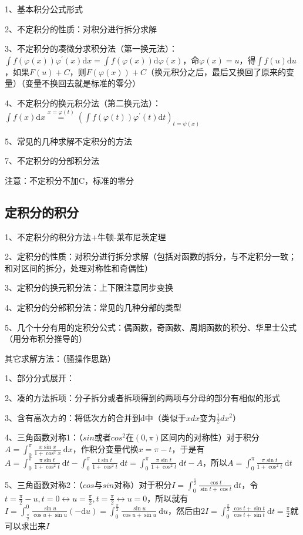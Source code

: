 1、基本积分公式形式

2、不定积分的性质：对积分进行拆分求解

3、不定积分的凑微分求积分法（第一换元法）：$\int f(\varphi(x)) \varphi^{\prime}(x) \mathrm{d} x =\int f(\varphi(x)) \mathrm{d} \varphi(x) $，命$\varphi(x)=u$，得$\int f(u) \mathrm{d} u $，如果$F(u)+C $，则$F(\varphi(x))+C$（换元积分之后，最后又换回了原来的变量）（变量不换回去就是标准的零分）

4、不定积分的换元积分法（第二换元法）：$\int f(x) \mathrm{d} x \stackrel{x=\varphi(t)}{=}\left(\int f(\varphi(t)) \varphi^{\prime}(t) \mathrm{d} t\right)_{t=\psi(x)}$

5、常见的几种求解不定积分的方法

7、不定积分的分部积分法

注意：不定积分不加C，标准的零分



\subsection{定积分的积分}

1、不定积分的积分方法+牛顿-莱布尼茨定理

2、定积分的性质：对积分进行拆分求解（包括对函数的拆分，与不定积分一致；和对区间的拆分，处理对称性和奇偶性）

3、定积分的换元积分法：上下限注意同步变换

4、定积分的分部积分法：常见的几种分部的类型

5、几个十分有用的定积分公式：偶函数，奇函数、周期函数的积分、华里士公式（用分布积分推导的）

其它求解方法：（骚操作思路）

1、部分分式展开：

2、凑的方法拆项：分子拆分或者拆项得到的两项与分母的部分有相似的形式

3、含有高次方的：将低次方的合并到d中（类似于$xdx$变为$\frac{1}{2}dx^2$）

4、三角函数对称1：（$sin$或者$cos^2$在$(0,\pi)$区间内的对称性）对于积分$A=\int_{0}^{\pi} \frac{x \sin x}{1+\cos ^{2} x} \mathrm{~d} x$，作积分变量代换$x=\pi-t$，于是有$A=\int_{0}^{\pi} \frac{\pi \sin t}{1+\cos ^{2} t} \mathrm{~d} t-\int_{0}^{\pi} \frac{t \sin t}{1+\cos ^{2} t} \mathrm{~d} t=\int_{0}^{\pi} \frac{\pi \sin t}{1+\cos ^{2} t} \mathrm{~d} t-A$，所以$A=\int_{0}^{\pi} \frac{\pi \sin t}{1+\cos ^{2} t} \mathrm{~d} t$

5、三角函数对称2：（$cos$与$sin$对称）对于积分$I=\int_{0}^{\frac{\pi}{2}} \frac{\cos t}{\sin t+\cos t} \mathrm{~d} t$，令$t=\frac{\pi}{2}-u, t=0 \leftrightarrow u=\frac{\pi}{2}, t=\frac{\pi}{2} \leftrightarrow u=0$，所以就有$I=\int_{\frac{\pi}{2}}^{0} \frac{\sin u}{\cos u+\sin u}(-\mathrm{d} u)=\int_{0}^{\frac{\pi}{2}} \frac{\sin u}{\cos u+\sin u} \mathrm{~d} u$，然后由$2 I=\int_{0}^{\frac{\pi}{2}} \frac{\cos t+\sin t}{\cos t+\sin t} \mathrm{~d} t=\frac{\pi}{2}$就可以求出来$I$

